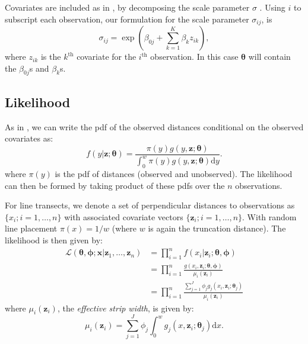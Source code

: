 \documentclass[useAMS,referee,usenatbib]{biom}
\begin{document}
Covariates are included as in \cite{Marques:2003vb}, by decomposing the scale parameter $\sigma$ \cite[see also][]{Marques:2007vm}.  Using $i$ to subscript each observation, our formulation for the scale parameter $\sigma_{ij}$, is
\begin{equation*}
\sigma_{ij} = \exp( \beta_{0j} + \sum_{k=1}^K \beta_k z_{ik}),
\end{equation*}
where $z_{ik}$ is the $k^\text{th}$ covariate for the $i^\text{th}$ observation. In this case $\bm{\theta}$ will contain the $\beta_{0j}$s and $\beta_k$s.

\subsection{Likelihood}
\label{s:likelihood}

As in \cite{Buckland:2004ts}, we can write the pdf of the observed distances conditional on the observed covariates as:
\begin{equation*}
f(y \vert \bm{z}; \bm{\theta}) = \frac{\pi(y)g(y, \bm{z}; \bm{\theta})}{\int_0^w \pi(y)g(y, \bm{z}; \bm{\theta}) \text{d}y}.
\end{equation*}
where $\pi(y)$ is the pdf of distances (observed and unobserved). The likelihood can then be formed by taking product of these pdfs over the $n$ observations.

For line transects, we denote a set of perpendicular distances to observations as $\{x_i; i=1,\ldots,n\}$ with associated covariate vectors $\{\bm{z}_i; i=1,\ldots,n\}$. With random line placement $\pi(x)=1/w$ (where $w$ is again the truncation distance). The likelihood is then given by:
\begin{align*}
\mathcal{L}(\bm{\theta},\bm{\phi}; \mathbf{x} \vert \bm{z}_1, \ldots, \bm{z}_n) &= \prod_{i=1}^n f(x_i \vert \bm{z}_i; \bm{\theta},\bm{\phi})\\
&= \prod_{i=1}^n \frac{g(x_i,\bm{z}_i; \bm{\theta},\bm{\phi})}{\mu_i(\bm{z}_i)}\\
&= \prod_{i=1}^n \frac{\sum_{j=1}^J \phi_j g_j(x_i,\bm{z}_i; \bm{\theta}_j)}{\mu_i(\bm{z}_i)}
\end{align*}
where $\mu_i(\bm{z}_i)$, the \textit{effective strip width}, is given by:
\begin{equation*}
\mu_{i}(\bm{z}_i) = \sum_{j=1}^J \phi_j \int_0^w  g_j(x,\bm{z}_i; \bm{\theta}_j) \text{d}x.
\end{equation*}
\end{document}
